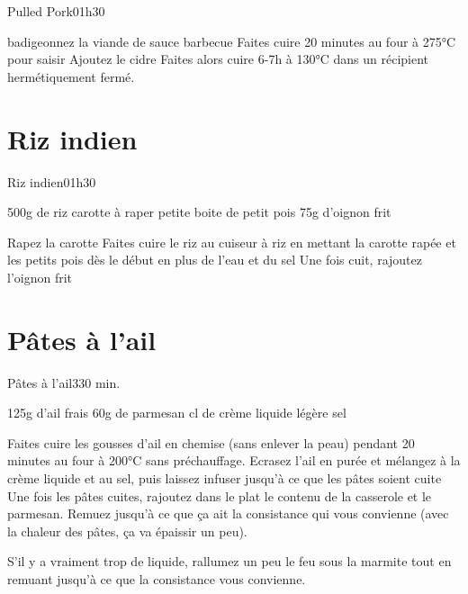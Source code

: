 {\begin{recette}{Pulled Pork}{0}{1h30}{}
\begin{preparation}
\etape badigeonnez la viande de sauce barbecue
\etape Faites cuire 20 minutes au four à 275°C pour saisir
\etape Ajoutez le cidre
\etape Faites alors cuire 6-7h à 130°C dans un récipient hermétiquement fermé.
\end{preparation}
\end{recette}

\section{Riz indien}
\begin{recette}{Riz indien}{0}{1h30}{}
\begin{ingredients}
\ingredient 500g de riz
 carotte à raper
\ingredient petite boite de petit pois
\ingredient 75g d'oignon frit
\end{ingredients}

\begin{preparation}
\etape Rapez la carotte
\etape Faites cuire le riz au cuiseur à riz en mettant la carotte rapée et les petits pois dès le début en plus de l'eau et du sel
\etape Une fois cuit, rajoutez l'oignon frit
\end{preparation}
\end{recette}

\section{Pâtes à l'ail}
\begin{recette}{Pâtes à l'ail}{3}{30 min.}{}
\begin{ingredients}
\ingredient 125g d'ail frais
\ingredient 60g de parmesan
 cl de crème liquide légère 
\ingredient sel
\end{ingredients}


\begin{preparation}
\etape Faites cuire les gousses d'ail en chemise (sans enlever la peau) pendant 20 minutes au four à 200°C sans préchauffage. 
\etape Ecrasez l'ail en purée et mélangez à la crème liquide et au sel, puis laissez infuser jusqu'à ce que les pâtes soient cuite
\etape Une fois les pâtes cuites, rajoutez dans le plat le contenu de la casserole et le parmesan. Remuez jusqu'à ce que ça ait la consistance qui vous convienne (avec la chaleur des pâtes, ça va épaissir un peu).
\begin{remarque}
S'il y a vraiment trop de liquide, rallumez un peu le feu sous la marmite tout en remuant jusqu'à ce que la consistance vous convienne.
\end{remarque}
\end{preparation}
\end{recette}


}%
